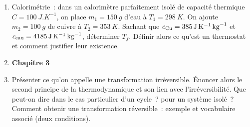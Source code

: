\documentclass[a4paper, 12pt, final, garamond]{book}
\begin{document}
\begin{enumerate}[label=\sqenumi]
    \item Calorimétrie~: dans un calorimètre parfaitement isolé de capacité
      thermique $C = \SI{100}{J.K^{-1}}$, on place $m_1 = \SI{150}{g}$ d'eau à
      $T_1 = \SI{298}{K}$. On ajoute $m_2 = \SI{100}{g}$ de cuivre à $T_2 =
      \SI{353}{K}$. Sachant que $c_{\rm Cu} = \SI{385}{J.K^{-1}.kg^{-1}}$ et
      $c_{\rm eau} = \SI{4185}{J.K^{-1}.kg^{-1}}$, déterminer $T_f$. Définir
      alors ce qu'est un thermostat et comment justifier leur existence.

    \item[] \textbf{Chapitre 3}
    \item Présenter ce qu'on appelle une transformation irréversible. Énoncer
      alors le second principe de la thermodynamique et son lien avec
      l'irréversibilité. Que peut-on dire dans le cas particulier d'un cycle~?
      pour un système isolé~? Comment obtenir une transformation réversible~:
      exemple et vocabulaire associé (deux conditions).

\end{enumerate}
\vspace{-5pt}
\end{document}
